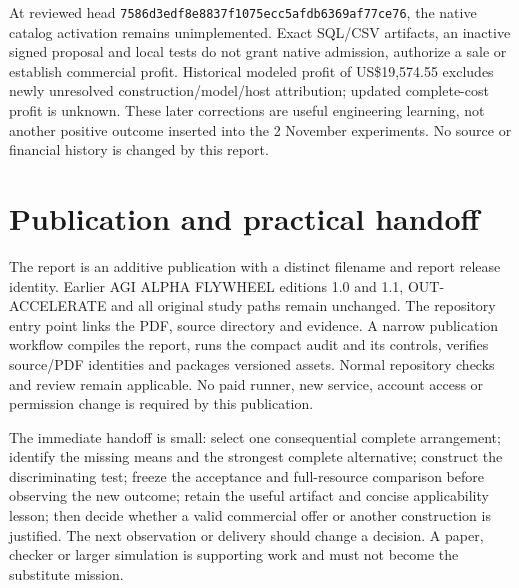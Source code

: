 At reviewed head \nolinkurl{7586d3edf8e8837f1075ecc5afdb6369af77ce76}, the native catalog activation remains unimplemented. Exact SQL/CSV artifacts, an inactive signed proposal and local tests do not grant native admission, authorize a sale or establish commercial profit. Historical modeled profit of US\$19,574.55 excludes newly unresolved construction/model/host attribution; updated complete-cost profit is unknown. These later corrections are useful engineering learning, not another positive outcome inserted into the 2 November experiments. No source or financial history is changed by this report.

\section{Publication and practical handoff}
The report is an additive publication with a distinct filename and report release identity. Earlier AGI ALPHA FLYWHEEL editions 1.0 and 1.1, OUT-ACCELERATE and all original study paths remain unchanged. The repository entry point links the PDF, source directory and evidence. A narrow publication workflow compiles the report, runs the compact audit and its controls, verifies source/PDF identities and packages versioned assets. Normal repository checks and review remain applicable. No paid runner, new service, account access or permission change is required by this publication.

The immediate handoff is small: select one consequential complete arrangement; identify the missing means and the strongest complete alternative; construct the discriminating test; freeze the acceptance and full-resource comparison before observing the new outcome; retain the useful artifact and concise applicability lesson; then decide whether a valid commercial offer or another construction is justified. The next observation or delivery should change a decision. A paper, checker or larger simulation is supporting work and must not become the substitute mission.
